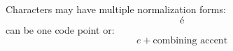 \documentclass[11pt,twoside,openany]{book}
\begin{document}
Characters may have multiple normalization forms:
\[
\text{é}
\]
can be one code point or:
\[
e+\text{combining accent}
\]
\end{document}
